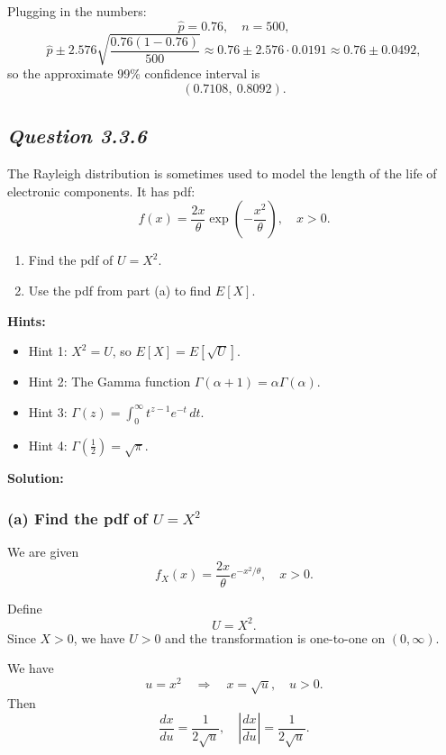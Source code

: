 \documentclass[11pt,letterpaper]{article}
\theoremstyle{remark}
\begin{document}
Plugging in the numbers:
\[
\hat{p} = 0.76, \quad n = 500,
\]
\[
\hat{p} \pm 2.576 \sqrt{\frac{0.76(1-0.76)}{500}}
\approx 0.76 \pm 2.576 \cdot 0.0191
\approx 0.76 \pm 0.0492,
\]
so the approximate 99\% confidence interval is
\[
\boxed{(0.7108,\ 0.8092).}
\]

\newpage

\subsection*{\textbf{\textit{Question 3.3.6}}}

The Rayleigh distribution is sometimes used to model the length of the life of electronic components. It has
pdf:
\[
f(x) = \frac{2x}{\theta} \exp\left(-\frac{x^2}{\theta}\right), \quad x > 0.
\]

\begin{enumerate}
    \item[(a)] Find the pdf of $U = X^2$.
    \item[(b)] Use the pdf from part (a) to find $E[X]$.
\end{enumerate}

\noindent\textbf{Hints:}
\begin{itemize}
    \item Hint 1: $X^2 = U$, so $E[X] = E[\sqrt{U}]$.
    \item Hint 2: The Gamma function $\Gamma(\alpha + 1) = \alpha \Gamma(\alpha)$.
    \item Hint 3: $\Gamma(z) = \displaystyle \int_0^\infty t^{z-1} e^{-t}\,dt$.
    \item Hint 4: $\Gamma\left(\tfrac{1}{2}\right) = \sqrt{\pi}$.
\end{itemize}

\vspace{1cm}

\textbf{Solution:}

\subsubsection*{(a) Find the pdf of $U = X^2$}

We are given
\[
f_X(x) = \frac{2x}{\theta} e^{-x^2/\theta}, \quad x > 0.
\]

Define
\[
U = X^2.
\]
Since $X > 0$, we have $U > 0$ and the transformation is one-to-one on $(0,\infty)$.

We have
\[
u = x^2 \quad \Longrightarrow \quad x = \sqrt{u}, \quad u > 0.
\]
Then
\[
\frac{dx}{du} = \frac{1}{2\sqrt{u}}, \quad \left|\frac{dx}{du}\right| = \frac{1}{2\sqrt{u}}.
\]
\end{document}
